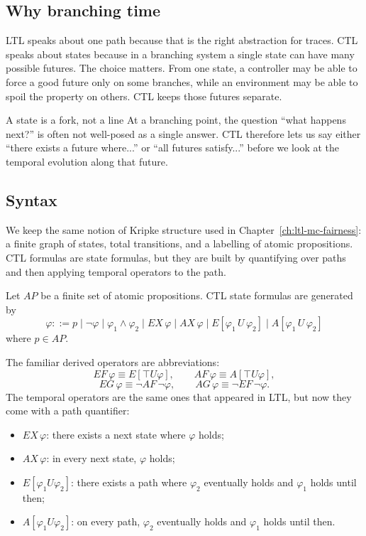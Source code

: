 \subsection{Why branching time}

LTL speaks about one path because that is the right abstraction for traces.
CTL speaks about states because in a branching system a single state can have
many possible futures.  The choice matters.  From one state, a controller may
be able to force a good future only on some branches, while an environment may
be able to spoil the property on others.  CTL keeps those futures separate.

\begin{intermezzo}{A state is a fork, not a line}
At a branching point, the question ``what happens next?'' is often not
well-posed as a single answer.  CTL therefore lets us say either ``there
exists a future where...'' or ``all futures satisfy...'' before we look at
the temporal evolution along that future.
\end{intermezzo}

\subsection{Syntax}

We keep the same notion of Kripke structure used in Chapter~\ref{ch:ltl-mc-fairness}:
a finite graph of states, total transitions, and a labelling of atomic
propositions.  CTL formulas are state formulas, but they are built by
quantifying over paths and then applying temporal operators to the path.

\begin{definition}
\label{def:ctl-syntax}
Let $AP$ be a finite set of atomic propositions.  CTL state formulas are
generated by
\[
  \varphi ::= p \mid \neg \varphi \mid \varphi_1 \land \varphi_2
             \mid EX\,\varphi \mid AX\,\varphi
             \mid E[\varphi_1\,U\,\varphi_2] \mid A[\varphi_1\,U\,\varphi_2]
\]
where $p \in AP$.
\end{definition}

The familiar derived operators are abbreviations:
\[
  EF\,\varphi \equiv E[\top U \varphi], \qquad
  AF\,\varphi \equiv A[\top U \varphi],
\]
\[
  EG\,\varphi \equiv \neg AF\,\neg\varphi, \qquad
  AG\,\varphi \equiv \neg EF\,\neg\varphi.
\]
The temporal operators are the same ones that appeared in LTL, but now they
come with a path quantifier:
\begin{itemize}
  \item $EX\,\varphi$: there exists a next state where $\varphi$ holds;
  \item $AX\,\varphi$: in every next state, $\varphi$ holds;
  \item $E[\varphi_1 U \varphi_2]$: there exists a path where $\varphi_2$
        eventually holds and $\varphi_1$ holds until then;
  \item $A[\varphi_1 U \varphi_2]$: on every path, $\varphi_2$ eventually
        holds and $\varphi_1$ holds until then.
\end{itemize}


